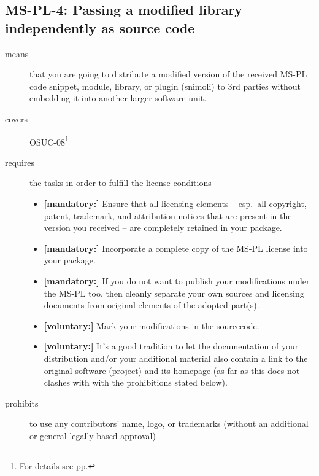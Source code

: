 \subsection{MS-PL-4: Passing a modified library independently as source code}
\label{OSUC-08-MS-PL}
\begin{description}
\item[means] that you are going to distribute a modified version of the received
MS-PL code snippet, module, library, or plugin (snimoli) to 3rd parties without
embedding it into another larger software unit.
\item[covers] OSUC-08\footnote{For details see pp. \pageref{OSUC-08-DEF}}
\item[requires] the tasks in order to fulfill the license conditions

\begin{itemize}
  \item \textbf{[mandatory:]} Ensure that all licensing elements -- esp.\ all
  copyright, patent, trademark, and attribution notices that are present in the
  version you received -- are completely retained in your package.
 
  \item \textbf{[mandatory:]} Incorporate a complete copy of the MS-PL license
  into your package.
  
  \item \textbf{[mandatory:]} If you do not want to publish your modifications
  under the MS-PL too, then cleanly separate your own sources and licensing
  documents from original elements of the adopted part(s).
  
  \item \textbf{[voluntary:]} Mark your modifications in the sourcecode.
  
  \item \textbf{[voluntary:]} It's a good tradition to let the documentation of
  your distribution and/or your additional material also contain a link to the
  original software (project) and its homepage (as far as this does not clashes
  with with the prohibitions stated below).
  
\end{itemize}

\item[prohibits] to use any contributors' name, logo, or trademarks (without an
additional or general legally based approval)

\end{description}

